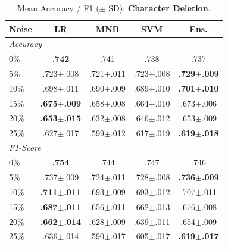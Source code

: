 \documentclass[sigconf]{acmart}
\begin{document}
\begin{table}
  \centering
  \caption{Mean Accuracy / F1 ($\pm$ SD): \textbf{Character Deletion}.}
  \label{tab:deletion}
  \small
  \begin{tabular}{lcccc}
    \toprule
    \textbf{Noise} & \textbf{LR} & \textbf{MNB} & \textbf{SVM} & \textbf{Ens.} \\
    \midrule
    \multicolumn{5}{l}{\textit{Accuracy}} \\
    0\%  & \textbf{.742} & .741 & .738 & .737 \\
    5\%  & .723$\pm$.008 & .721$\pm$.011 & .723$\pm$.008 & \textbf{.729$\pm$.009} \\
    10\% & .698$\pm$.011 & .690$\pm$.009 & .689$\pm$.010 & \textbf{.701$\pm$.010} \\
    15\% & \textbf{.675$\pm$.009} & .658$\pm$.008 & .664$\pm$.010 & .673$\pm$.006 \\
    20\% & \textbf{.653$\pm$.015} & .632$\pm$.008 & .646$\pm$.012 & .653$\pm$.009 \\
    25\% & .627$\pm$.017 & .599$\pm$.012 & .617$\pm$.019 & \textbf{.619$\pm$.018} \\
    \midrule
    \multicolumn{5}{l}{\textit{F1-Score}} \\
    0\%  & \textbf{.754} & .744 & .747 & .746 \\
    5\%  & .737$\pm$.009 & .724$\pm$.011 & .728$\pm$.008 & \textbf{.736$\pm$.009} \\
    10\% & \textbf{.711$\pm$.011} & .693$\pm$.009 & .693$\pm$.012 & .707$\pm$.011 \\
    15\% & \textbf{.687$\pm$.011} & .656$\pm$.011 & .662$\pm$.013 & .676$\pm$.008 \\
    20\% & \textbf{.662$\pm$.014} & .628$\pm$.009 & .639$\pm$.011 & .654$\pm$.009 \\
    25\% & .636$\pm$.014 & .590$\pm$.017 & .605$\pm$.017 & \textbf{.619$\pm$.017} \\
    \bottomrule
  \end{tabular}
\end{table}
\end{document}
